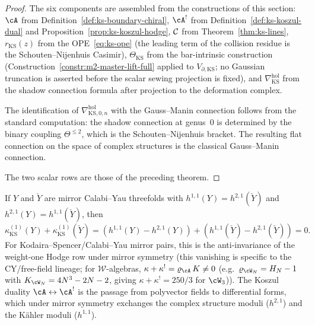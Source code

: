 \begin{proof}
The six components are assembled from the constructions of this
section:
$\cA$ from Definition~\ref{def:ks-boundary-chiral},
$\cA^!$ from Definition~\ref{def:ks-koszul-dual} and
Proposition~\ref{prop:ks-koszul-hodge},
$\mathcal C$ from Theorem~\ref{thm:ks-lines},
$r_{\mathrm{KS}}(z)$ from the OPE~\eqref{eq:ks-ope} (the
leading term of the collision residue is the Schouten--Nijenhuis
Casimir),
$\Theta_{\mathrm{KS}}$ from the bar-intrinsic construction
(Construction~\ref{constr:m2-master-lift-full} applied to
$V_{\partial,\mathrm{KS}}$; no Gaussian truncation is asserted before
the scalar sewing projection is fixed),
and $\nabla^{\mathrm{hol}}_{\mathrm{KS}}$ from the shadow
connection formula after projection to the deformation complex.

The identification of $\nabla^{\mathrm{hol}}_{\mathrm{KS},0,n}$
with the Gauss--Manin connection follows from the standard
computation: the shadow connection at genus~$0$ is determined by
the binary coupling $\Theta^{\le 2}$, which is the
Schouten--Nijenhuis bracket. The resulting flat connection on
the space of complex structures is the classical Gauss--Manin
connection.

The two scalar rows are those of the preceding theorem.
\end{proof}

\begin{remark}
If $Y$ and $\check{Y}$ are mirror Calabi--Yau threefolds with
$h^{1,1}(Y)=h^{2,1}(\check{Y})$ and $h^{2,1}(Y)=h^{1,1}(\check{Y})$,
then
\[
\kappa_{\mathrm{KS}}^{(1)}(Y) + \kappa_{\mathrm{KS}}^{(1)}(\check{Y})
= (h^{1,1}(Y)-h^{2,1}(Y)) + (h^{1,1}(\check{Y})-h^{2,1}(\check{Y}))
= 0.
\]
For Kodaira--Spencer/Calabi--Yau mirror pairs, this is the
anti-invariance of the weight-one Hodge row under mirror symmetry
(this vanishing is specific to the CY/free-field lineage; for
$\mathcal{W}$-algebras, $\kappa+\kappa^! = \varrho_{\cA}\,K \neq 0$
(e.g.\ $\varrho_{\cW_N} = H_N - 1$ with $K_{\cW_N} = 4N^3 - 2N - 2$,
giving $\kappa+\kappa^! = 250/3$ for $\cW_3$)). The
Koszul duality $\cA\leftrightarrow\cA^!$ is the passage from
polyvector fields to differential forms, which under mirror
symmetry exchanges the complex structure moduli ($h^{2,1}$) and
the K\"ahler moduli ($h^{1,1}$).
\end{remark}

